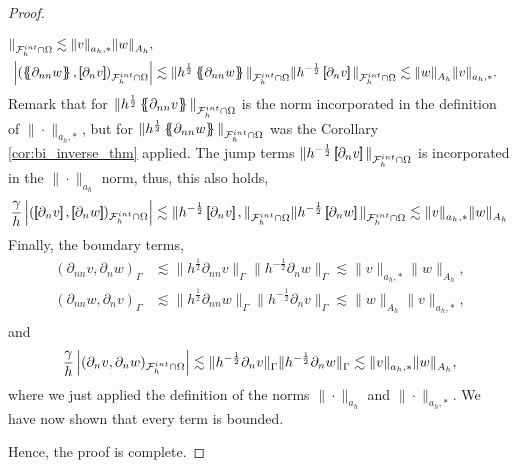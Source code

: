 \begin{proof}
\begin{enumerate}[label=\arabic*)]
\[\begin{split}
    \|_{\mathcal{F}_{h}^{int} \cap \Omega  }^{  } \lesssim \| v  \|_{ a_{h},*  }^{  }\|  w \|_{A_{h}  }^{  }, \\
            \abs{\left( \mean{  \partial _{n n} w }, \jump{ \partial _{n }v} \right)_{\mathcal{F}_{h}^{int} \cap \Omega}  } &\lesssim \| h^{\frac{1}{2}}\mean{ \partial _{nn}w }   \|_{ \mathcal{F}_{h}^{int} \cap \Omega  }^{  } \| h^{-\frac{1}{2}}\jump{ \partial _{n }v}
    \|_{\mathcal{F}_{h}^{int} \cap \Omega  }^{  } \lesssim \| w  \|_{A_{h}  }^{  }\|  v \|_{ a_{h},*  }^{  }.
        \end{split}
    \]
    Remark that for $\| h^{\frac{1}{2}} \left\{\!\!\left\{ \partial _{nn} v \right\}\!\!\right\}   \|_{\mathcal{F}^{int} _{h} \cap \Omega   }^{  } $ is the norm incorporated in the definition of $\| \cdot  \|_{ a_{h},* }^{  } $, but for $\| h^{\frac{1}{2}} \left\{\!\!\left\{ \partial _{nn} w \right\}\!\!\right\}   \|_{
    \mathcal{F}_{h}^{int}\cap \Omega   }^{  } $ was the Corollary \ref{cor:bi_inverse_thm} applied. The jump terms $\|h^{-\frac{1}{2}} \left[\!\!\left[ \partial _{n} v   \right]\!\!\right]   \|_{\mathcal{F}^{int}_{h}\cap \Omega    }^{  } $
is incorporated in the $\| \cdot  \|_{ a_{h} }^{  } $ norm, thus, this also holds, \[
\frac{\gamma }{h}\abs{  ( \jump{ \partial _{n} v }  , \jump{\partial _{n} w }  )_{\mathcal{F}^{int} _{h} \cap \Omega } } \lesssim \| h^{-\frac{1}{2}} \jump{\partial _{n} v },      \|_{ \mathcal{F}^{int} _{h}\cap \Omega   }^{  }     \|
h^{-\frac{1}{2}} \jump{\partial _{n} w } \|_{\mathcal{F}^{int} _{h}\cap \Omega
}^{  } \lesssim \| v \|_{ a_{h},* }^{  } \| w \|_{ A_{h} }^{  }
\]
Finally, the boundary terms, \[
    \begin{split}
( \partial _{nn} v, \partial _{n} w)_\Gamma & \lesssim \| h^{\frac{1}{2}} \partial _{nn} v \|_{ \Gamma   }^{  }  \|h^{-\frac{1}{2}} \partial _{n} w \|_{ \Gamma   }^{  } \lesssim \| v \|_{ a_{h},* }^{  } \| w \|_{ A_{h} }^{  }   , \\
( \partial _{nn} w, \partial _{n} v)_\Gamma & \lesssim \| h^{\frac{1}{2}} \partial _{nn} w \|_{ \Gamma   }^{  }  \|h^{-\frac{1}{2}} \partial _{n} v \|_{ \Gamma   }^{  } \lesssim \| w \|_{ A_{h} }^{  } \| v \|_{ a_{h},* }^{  }   , \\
    \end{split}
\]
and \[
\frac{\gamma }{h} \left\lvert  (  \partial _{n} v, \partial _{n}w)_{\mathcal{F}^{int} _{h} \cap \Omega }    \right\rvert\lesssim \| h^{- \frac{1}{2}} \partial _{n} v \|_{ \Gamma   }^{  }  \| h^{-\frac{1}{2}} \partial _{n} w \|_{ \Gamma   }^{  } \lesssim \| v \|_{ a_{h},*
}^{  } \| w \|_{ A_{h}  }^{  },
\]
where we just applied the definition of the norms $\| \cdot  \|_{a_{h}  }^{  } $ and $\| \cdot  \|_{a_{h},*  }^{  } $. We have now shown that every term is bounded.

    \end{enumerate}
    Hence, the proof is complete.
\end{proof}

